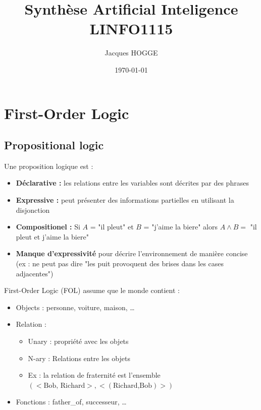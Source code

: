 \documentclass[12pt]{article}
\title{Synthèse Artificial Inteligence LINFO1115}
\author{Jacques HOGGE}
\date{\today}
\begin{document}
\maketitle
\newpage
\tableofcontents
\newpage



\newpage



\newpage



\newpage



\newpage



\newpage



\newpage



\newpage

			

\section{First-Order Logic}
	\subsection{Propositional logic}
		Une proposition logique est :
		\begin{itemize}
			\item \textbf{Déclarative :} les relations entre les variables sont décrites par des phrases
			\item \textbf{Expressive :} peut présenter des informations partielles en utilisant la disjonction
			\item \textbf{Compositionel :} Si $A$ = "il pleut" et $B$ = "j'aime la biere" alors $A \wedge B =$ "il pleut et j'aime la biere"
			\item \textbf{Manque d'expressivité} pour décrire l'environnement de manière concise (ex : ne peut pas dire "les puit provoquent des brises dans les cases adjacentes")
		\end{itemize}
		
		First-Order Logic (FOL) assume que le monde contient :
		\begin{itemize}
			\item Objects : personne, voiture, maison, \dots
			\item Relation : 
			\begin{itemize}
				\item Unary : propriété avec les objets
				\item N-ary : Relations entre les objets
				\item Ex : la relation de fraternité est l'ensemble $(<\text{Bob, Richard}>,<(\text{Richard,Bob})>)$
			\end{itemize}
			\item Fonctions : father\_of, successeur, \dots
		\end{itemize}
\end{document}
